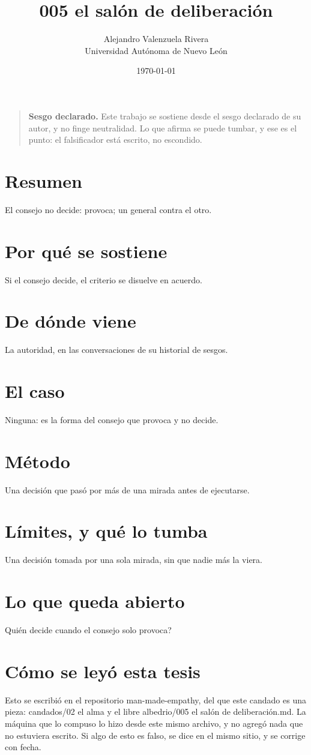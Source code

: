 \documentclass[11pt,a4paper]{article}
\title{005 el salón de deliberación}
\author{Alejandro Valenzuela Rivera\\\small Universidad Autónoma de Nuevo León}
\date{\today}
\begin{document}
\maketitle

\begin{quote}
\textbf{Sesgo declarado.} Este trabajo se sostiene desde el sesgo declarado de su autor, y no finge neutralidad. Lo que afirma se puede tumbar, y ese es el punto: el falsificador está escrito, no escondido.
\end{quote}

\section*{Resumen}
El consejo no decide: provoca; un general contra el otro.

\section{Por qué se sostiene}
Si el consejo decide, el criterio se disuelve en acuerdo.

\section{De dónde viene}
La autoridad, en las conversaciones de su historial de sesgos.

\section{El caso}
Ninguna: es la forma del consejo que provoca y no decide.

\section{Método}
Una decisión que pasó por más de una mirada antes de ejecutarse.

\section{Límites, y qué lo tumba}
Una decisión tomada por una sola mirada, sin que nadie más la viera.

\section{Lo que queda abierto}
\textquestiondown{}Quién decide cuando el consejo solo provoca?

\section*{Cómo se leyó esta tesis}
Esto se escribió en el repositorio man-made-empathy, del que este candado es una pieza: candados/02 el alma y el libre albedrio/005 el salón de deliberación.md. La máquina que lo compuso lo hizo desde este mismo archivo, y no agregó nada que no estuviera escrito. Si algo de esto es falso, se dice en el mismo sitio, y se corrige con fecha.
\end{document}
